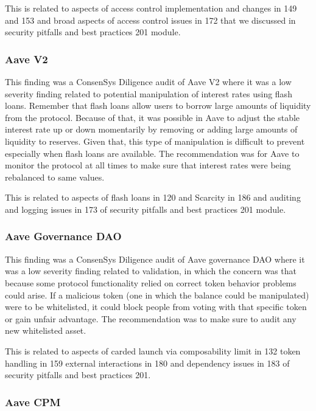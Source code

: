 This is related to aspects of access control implementation and changes
in 149 and 153 and broad aspects of access control issues in 172 that we
discussed in security pitfalls and best practices 201 module.

\subsubsection{Aave V2}\label{aave-v2}

This finding was a ConsenSys Diligence audit of Aave V2 where it was a
low severity finding related to potential manipulation of interest rates
using flash loans. Remember that flash loans allow users to borrow large
amounts of liquidity from the protocol. Because of that, it was possible
in Aave to adjust the stable interest rate up or down momentarily by
removing or adding large amounts of liquidity to reserves. Given that,
this type of manipulation is difficult to prevent especially when flash
loans are available. The recommendation was for Aave to monitor the
protocol at all times to make sure that interest rates were being
rebalanced to same values.

This is related to aspects of flash loans in 120 and Scarcity in 186 and
auditing and logging issues in 173 of security pitfalls and best
practices 201 module.

\subsubsection{Aave Governance DAO}\label{aave-governance-dao}

This finding was a ConsenSys Diligence audit of Aave governance DAO
where it was a low severity finding related to validation, in which the
concern was that because some protocol functionality relied on correct
token behavior problems could arise. If a malicious token (one in which
the balance could be manipulated) were to be whitelisted, it could block
people from voting with that specific token or gain unfair advantage.
The recommendation was to make sure to audit any new whitelisted asset.

This is related to aspects of carded launch via composability limit in
132 token handling in 159 external interactions in 180 and dependency
issues in 183 of security pitfalls and best practices 201.

\subsubsection{Aave CPM}\label{aave-cpm}

